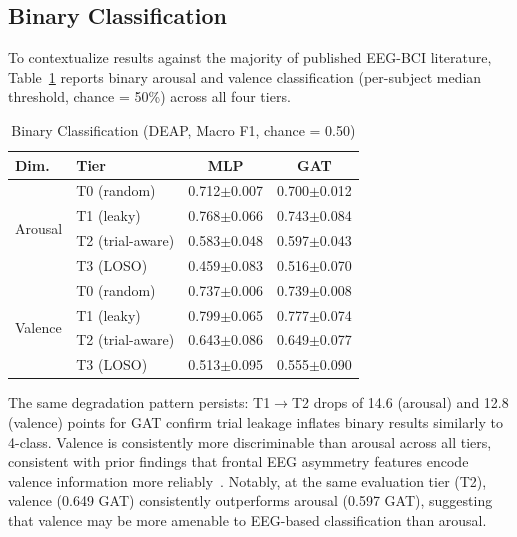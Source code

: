 \documentclass[a4paper, 10pt, conference]{ieeeconf}
\begin{document}
\subsection{Binary Classification}

To contextualize results against the majority of published EEG-BCI literature, Table~\ref{tab:binary} reports binary arousal and valence classification (per-subject median threshold, chance = 50\%) across all four tiers.

\begin{table}[t]
\centering
\caption{Binary Classification (DEAP, Macro F1, chance = 0.50)}
\label{tab:binary}
\begin{tabular}{llcc}
\toprule
Dim. & Tier & MLP & GAT \\
\midrule
\multirow{4}{*}{Arousal}
 & T0 (random) & 0.712{\scriptsize$\pm$0.007} & 0.700{\scriptsize$\pm$0.012} \\
 & T1 (leaky) & 0.768{\scriptsize$\pm$0.066} & 0.743{\scriptsize$\pm$0.084} \\
 & T2 (trial-aware) & 0.583{\scriptsize$\pm$0.048} & 0.597{\scriptsize$\pm$0.043} \\
 & T3 (LOSO) & 0.459{\scriptsize$\pm$0.083} & 0.516{\scriptsize$\pm$0.070} \\
\midrule
\multirow{4}{*}{Valence}
 & T0 (random) & 0.737{\scriptsize$\pm$0.006} & 0.739{\scriptsize$\pm$0.008} \\
 & T1 (leaky) & 0.799{\scriptsize$\pm$0.065} & 0.777{\scriptsize$\pm$0.074} \\
 & T2 (trial-aware) & 0.643{\scriptsize$\pm$0.086} & 0.649{\scriptsize$\pm$0.077} \\
 & T3 (LOSO) & 0.513{\scriptsize$\pm$0.095} & 0.555{\scriptsize$\pm$0.090} \\
\bottomrule
\end{tabular}
\end{table}

The same degradation pattern persists: T1$\to$T2 drops of 14.6 (arousal) and 12.8 (valence) points for GAT confirm trial leakage inflates binary results similarly to 4-class. Valence is consistently more discriminable than arousal across all tiers, consistent with prior findings that frontal EEG asymmetry features encode valence information more reliably~\cite{allen2004, smith2017}. Notably, at the same evaluation tier (T2), valence (0.649 GAT) consistently outperforms arousal (0.597 GAT), suggesting that valence may be more amenable to EEG-based classification than arousal.
\end{document}
